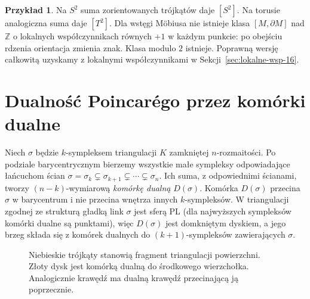 \documentclass[11pt,a4paper,oneside]{report}
\newcommand{\Z}{\mathbb{Z}}
\theoremstyle{plain}
\theoremstyle{definition}
\newtheorem{przyklad}[twierdzenie]{Przykład}
\theoremstyle{remark}
\begin{document}
\begin{przyklad}
Na $S^2$ suma zorientowanych
trójkątów daje $[S^2]$.
Na torusie analogiczna suma
daje $[T^2]$. Dla wstęgi
Möbiusa nie istnieje
klasa $[M,\partial M]$ nad $\Z$
o lokalnych współczynnikach
równych $+1$ w każdym punkcie:
po obejściu rdzenia orientacja
zmienia znak. Klasa modulo $2$
istnieje. Poprawną wersję
całkowitą uzyskamy z lokalnymi
współczynnikami w
Sekcji~\ref{sec:lokalne-wsp-16}.
\end{przyklad}

\section{Dualność Poincarégo przez komórki dualne}
\label{sec:dualnosc-komorkowa-16}

Niech $\sigma$ będzie $k$-sympleksem
triangulacji $K$ zamkniętej
$n$-rozmaitości. Po podziale
barycentrycznym bierzemy wszystkie
małe sympleksy odpowiadające
łańcuchom ścian
$\sigma=\sigma_k\subsetneq
\sigma_{k+1}\subsetneq\cdots
\subsetneq\sigma_n$.
Ich suma, z odpowiednimi
ścianami, tworzy
$(n-k)$-wymiarową
\emph{komórkę dualną} $D(\sigma)$.
Komórka $D(\sigma)$ przecina
$\sigma$ w barycentrum i nie
przecina wnętrza innych
$k$-sympleksów. W triangulacji zgodnej ze strukturą gładką link
$\sigma$ jest sferą PL (dla najwyższych sympleksów
komórki dualne są punktami), więc
$D(\sigma)$ jest domkniętym
dyskiem, a jego brzeg składa
się z komórek dualnych do
$(k+1)$-sympleksów
zawierających $\sigma$.

\begin{figure}[htbp]
\centering
{}
\caption{Niebieskie trójkąty stanowią fragment
triangulacji powierzchni. Złoty dysk jest
komórką dualną do środkowego wierzchołka.
Analogicznie krawędź ma dualną krawędź
przecinającą ją poprzecznie.}
\label{fig:dualna-komorka-16}
\end{figure}
\end{document}

